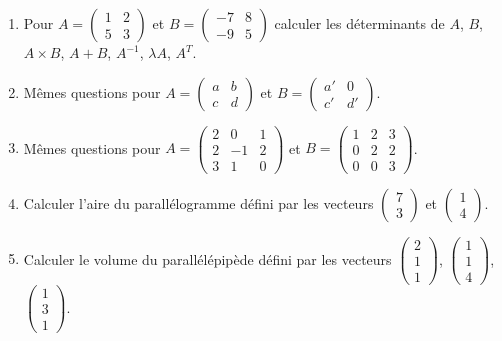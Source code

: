 \documentclass[class=report,crop=false]{standalone}
\begin{document}
\begin{miniexercices}
\sauteligne
\begin{enumerate}
  \item Pour $A = \begin{pmatrix}1&2\\5&3\end{pmatrix}$
  et $B = \begin{pmatrix}-7&8\\-9&5\end{pmatrix}$
  calculer les déterminants de $A$, $B$, $A \times B$, $A+B$, $A^{-1}$,
  $\lambda A$, $A^T$.

  \item Mêmes questions pour $A = \begin{pmatrix}a&b\\c&d\end{pmatrix}$
  et $B = \begin{pmatrix}a'&0\\c'&d'\end{pmatrix}$.

  \item Mêmes questions pour
  $A = \begin{pmatrix}2&0&1\\2&-1&2\\3&1&0\end{pmatrix}$
  et $B = \begin{pmatrix}1&2&3\\0&2&2\\0&0&3\end{pmatrix}$.

  \item Calculer l'aire du parallélogramme défini par les vecteurs
  $\left(\begin{smallmatrix}7\\3\end{smallmatrix}\right)$
  et $\left(\begin{smallmatrix}1\\4\end{smallmatrix}\right)$.

  \item Calculer le volume du parallélépipède défini
  par les vecteurs
  $\left(\begin{smallmatrix}2\\1\\1\end{smallmatrix}\right)$,
  $\left(\begin{smallmatrix}1\\1\\4\end{smallmatrix}\right)$,
  $\left(\begin{smallmatrix}1\\3\\1\end{smallmatrix}\right)$.
\end{enumerate}
\end{miniexercices}
\end{document}
